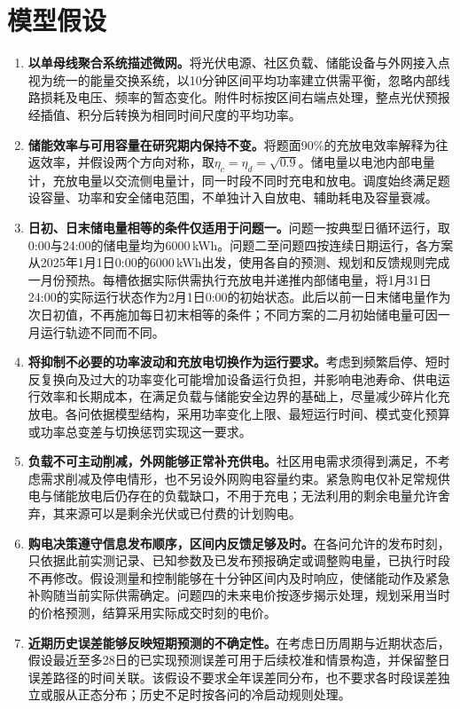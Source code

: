 \section{模型假设}
\begin{enumerate}[label=\textbf{假设\arabic*：},leftmargin=4.8em,itemsep=6pt]
\item \textbf{以单母线聚合系统描述微网。}将光伏电源、社区负载、储能设备与外网接入点视为统一的能量交换系统，以10分钟区间平均功率建立供需平衡，忽略内部线路损耗及电压、频率的暂态变化。附件时标按区间右端点处理，整点光伏预报经插值、积分后转换为相同时间尺度的平均功率。
\item \textbf{储能效率与可用容量在研究期内保持不变。}将题面90\%的充放电效率解释为往返效率，并假设两个方向对称，取$\eta_c=\eta_d=\sqrt{0.9}$。储电量以电池内部电量计，充放电量以交流侧电量计，同一时段不同时充电和放电。调度始终满足题设容量、功率和安全储电范围，不单独计入自放电、辅助耗电及容量衰减。
\item \textbf{日初、日末储电量相等的条件仅适用于问题一。}问题一按典型日循环运行，取0:00与24:00的储电量均为6000\,kWh。问题二至问题四按连续日期运行，各方案从2025年1月1日0:00的6000\,kWh出发，使用各自的预测、规划和反馈规则完成一月份预热。每槽依据实际供需执行充放电并递推内部储电量，将1月31日24:00的实际运行状态作为2月1日0:00的初始状态。此后以前一日末储电量作为次日初值，不再施加每日初末相等的条件；不同方案的二月初始储电量可因一月运行轨迹不同而不同。
\item \textbf{将抑制不必要的功率波动和充放电切换作为运行要求。}考虑到频繁启停、短时反复换向及过大的功率变化可能增加设备运行负担，并影响电池寿命、供电运行效率和长期成本，在满足负载与储能安全边界的基础上，尽量减少碎片化充放电。各问依据模型结构，采用功率变化上限、最短运行时间、模式变化预算或功率总变差与切换惩罚实现这一要求。
\item \textbf{负载不可主动削减，外网能够正常补充供电。}社区用电需求须得到满足，不考虑需求削减及停电情形，也不另设外网购电容量约束。紧急购电仅补足常规供电与储能放电后仍存在的负载缺口，不用于充电；无法利用的剩余电量允许舍弃，其来源可以是剩余光伏或已付费的计划购电。
\item \textbf{购电决策遵守信息发布顺序，区间内反馈足够及时。}在各问允许的发布时刻，只依据此前实测记录、已知参数及已发布预报确定或调整购电量，已执行时段不再修改。假设测量和控制能够在十分钟区间内及时响应，使储能动作及紧急补购随当前实际供需确定。问题四的未来电价按逐步揭示处理，规划采用当时的价格预测，结算采用实际成交时刻的电价。
\item \textbf{近期历史误差能够反映短期预测的不确定性。}在考虑日历周期与近期状态后，假设最近至多28日的已实现预测误差可用于后续校准和情景构造，并保留整日误差路径的时间关联。该假设不要求全年误差同分布，也不要求各时段误差独立或服从正态分布；历史不足时按各问的冷启动规则处理。
\end{enumerate}

